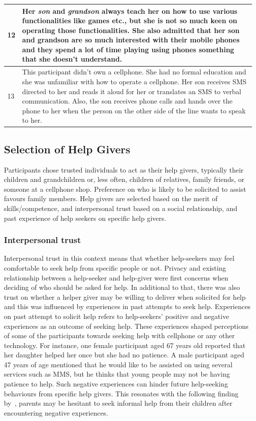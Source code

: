 \begin{table}[h!]
\begin{center}
\begin{tabular}{|p{1cm}|p{12cm}|}
	\hline
	12& Her \emph{son} and \emph{grandson} always teach her on how to use various functionalities like games etc., but she is not so much keen on operating those functionalities. She also admitted that her son and grandson are so much interested with their mobile phones and they spend a lot of time playing using phones something that she doesn't understand.\\
	\hline
	13& This participant didn't own a cellphone. She had no formal education and she was unfamiliar with how to operate a cellphone. Her son receives SMS directed to her and reads it aloud for her or translates an SMS to verbal communication. Also, the son receives phone calls and hands over the phone to her when the person on the other side of the line wants to speak to her.\\
	\hline
	\end{tabular}
  \end{center}
\end{table}
\subsection{Selection of Help Givers}
Participants chose trusted individuals to act as their help givers, typically their children and grandchildren or, less often, children of relatives, family friends, or someone at a cellphone shop. Preference on who is likely to be solicited to assist favours family members. Help givers are selected based on the merit of skills/competence, and interpersonal trust based on a social relationship, and past experience of help seekers on specific help givers.
\subsubsection*{Interpersonal trust}
Interpersonal trust in this context means that whether help-seekers may feel comfortable to seek help from specific people or not. Privacy and existing relationship between a help-seeker and help-giver were first concerns when deciding of who should be asked for help. In additional to that, there was also trust on whether a helper giver may be willing to deliver when solicited for help and this was influenced by experiences in past attempts to seek help. Experiences on past attempt to solicit help refers to help-seekers' positive and negative experiences as an outcome of seeking help. These experiences shaped perceptions of some of the participants towards seeking help with cellphone or any other technology. For instance, one female participant aged 67 years old reported that her daughter helped her once but she had no patience. A male participant aged 47 years of age mentioned that he would like to be assisted on using several services such as MMS, but he thinks that young people may not be having patience to help. Such negative experiences can hinder future help-seeking behaviours from specific help givers. This resonates with the following finding by~\cite{kiesler:twi}, parents may be hesitant to seek informal help from their children after encountering negative experiences.
